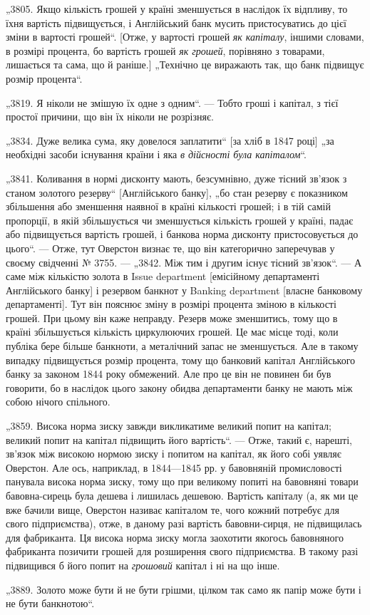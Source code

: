 
„3805. Якщо кількість грошей у країні зменшується в наслідок
їх відпливу, то їхня вартість підвищується, і Англійський банк
мусить пристосуватись до цієї зміни в вартості грошей“. [Отже, у вартості грошей \emph{як капіталу}, іншими
словами, в розмірі процента, бо вартість грошей \emph{як грошей}, порівняно з товарами,
лишається та сама, що й раніше.] „Технічно це виражають так,
що банк підвищує розмір процента“.

„3819. Я ніколи не змішую їх одне з одним“. — Тобто гроші
і капітал, з тієї простої причини, що він їх ніколи не розрізняє.

„3834. Дуже велика сума, яку довелося заплатити“ [за хліб
в 1847 році] „за необхідні засоби існування країни і яка \emph{в дійсності була капіталом}“.

„3841. Коливання в нормі дисконту мають, безсумнівно, дуже
тісний зв’язок з станом золотого резерву“ [Англійського
банку], „бо стан резерву є показником збільшення або зменшення
наявної в країні кількості грошей; і в тій самій пропорції, в якій
збільшується чи зменшується кількість грошей у країні, падає або
підвищується вартість грошей, і банкова норма дисконту пристосовується до цього“. — Отже, тут
Оверстон визнає те, що він
категорично заперечував у своєму свідченні № 3755. — „3842. Між
тим і другим існує тісний зв’язок“. — А саме між кількістю золота
в Issue department [емісійному департаменті Англійського банку]
і резервом банкнот у Banking department [власне банковому департаменті]. Тут він пояснює зміну в
розмірі процента зміною в кількості грошей. При цьому він каже неправду. Резерв може зменшитись,
тому що в країні збільшується кількість циркулюючих грошей.
Це має місце тоді, коли публіка бере більше банкноти, а металічний запас не зменшується. Але в
такому випадку підвищується
розмір процента, тому що банковий капітал Англійського банку
за законом 1844 року обмежений. Але про це він не повинен
би був говорити, бо в наслідок цього закону обидва департаменти банку не мають між собою нічого
спільного.

„3859. Висока норма зиску завжди викликатиме великий попит
на капітал; великий попит на капітал підвищить його вартість“. — Отже, такий є, нарешті, зв’язок між
високою нормою
зиску і попитом на капітал, як його собі уявляє Оверстон. Але
ось, наприклад, в 1844—1845 рр. у бавовняній промисловості
панувала висока норма зиску, тому що при великому попиті на
бавовняні товари бавовна-сирець була дешева і лишилась дешевою. Вартість капіталу (а, як ми це вже
бачили вище, Оверстон називає капіталом те, чого кожний потребує для свого
підприємства), отже, в даному разі вартість бавовни-сирця, не
підвищилась для фабриканта. Ця висока норма зиску могла
заохотити якогось бавовняного фабриканта позичити грошей для
розширення свого підприємства. В такому разі підвищився б його
попит на \emph{грошовий} капітал і ні на що інше.

„3889. Золото може бути й не бути грішми, цілком так само
як папір може бути і не бути банкнотою“.
